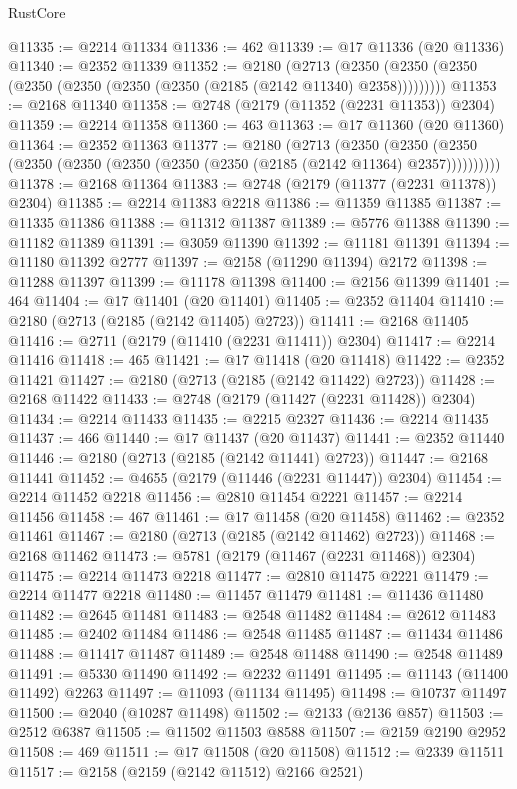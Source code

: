 \begin{lexlean}{RustCore}
\begin{coremodule}
@11335 := @2214 @11334
@11336 := 462
@11339 := @17 @11336 (@20 @11336)
@11340 := @2352 @11339
@11352 := @2180
    (@2713 (@2350 (@2350 (@2350 (@2350 (@2350 (@2350 (@2350 (@2185 (@2142 @11340) @2358)))))))))
@11353 := @2168 @11340
@11358 := @2748 (@2179 (@11352 (@2231 @11353)) @2304)
@11359 := @2214 @11358
@11360 := 463
@11363 := @17 @11360 (@20 @11360)
@11364 := @2352 @11363
@11377 := @2180
    (@2713
      (@2350 (@2350 (@2350 (@2350 (@2350 (@2350 (@2350 (@2350 (@2185 (@2142 @11364) @2357))))))))))
@11378 := @2168 @11364
@11383 := @2748 (@2179 (@11377 (@2231 @11378)) @2304)
@11385 := @2214 @11383 @2218
@11386 := @11359 @11385
@11387 := @11335 @11386
@11388 := @11312 @11387
@11389 := @5776 @11388
@11390 := @11182 @11389
@11391 := @3059 @11390
@11392 := @11181 @11391
@11394 := @11180 @11392 @2777
@11397 := @2158 (@11290 @11394) @2172
@11398 := @11288 @11397
@11399 := @11178 @11398
@11400 := @2156 @11399
@11401 := 464
@11404 := @17 @11401 (@20 @11401)
@11405 := @2352 @11404
@11410 := @2180 (@2713 (@2185 (@2142 @11405) @2723))
@11411 := @2168 @11405
@11416 := @2711 (@2179 (@11410 (@2231 @11411)) @2304)
@11417 := @2214 @11416
@11418 := 465
@11421 := @17 @11418 (@20 @11418)
@11422 := @2352 @11421
@11427 := @2180 (@2713 (@2185 (@2142 @11422) @2723))
@11428 := @2168 @11422
@11433 := @2748 (@2179 (@11427 (@2231 @11428)) @2304)
@11434 := @2214 @11433
@11435 := @2215 @2327
@11436 := @2214 @11435
@11437 := 466
@11440 := @17 @11437 (@20 @11437)
@11441 := @2352 @11440
@11446 := @2180 (@2713 (@2185 (@2142 @11441) @2723))
@11447 := @2168 @11441
@11452 := @4655 (@2179 (@11446 (@2231 @11447)) @2304)
@11454 := @2214 @11452 @2218
@11456 := @2810 @11454 @2221
@11457 := @2214 @11456
@11458 := 467
@11461 := @17 @11458 (@20 @11458)
@11462 := @2352 @11461
@11467 := @2180 (@2713 (@2185 (@2142 @11462) @2723))
@11468 := @2168 @11462
@11473 := @5781 (@2179 (@11467 (@2231 @11468)) @2304)
@11475 := @2214 @11473 @2218
@11477 := @2810 @11475 @2221
@11479 := @2214 @11477 @2218
@11480 := @11457 @11479
@11481 := @11436 @11480
@11482 := @2645 @11481
@11483 := @2548 @11482
@11484 := @2612 @11483
@11485 := @2402 @11484
@11486 := @2548 @11485
@11487 := @11434 @11486
@11488 := @11417 @11487
@11489 := @2548 @11488
@11490 := @2548 @11489
@11491 := @5330 @11490
@11492 := @2232 @11491
@11495 := @11143 (@11400 @11492) @2263
@11497 := @11093 (@11134 @11495)
@11498 := @10737 @11497
@11500 := @2040 (@10287 @11498)
@11502 := @2133 (@2136 @857)
@11503 := @2512 @6387
@11505 := @11502 @11503 @8588
@11507 := @2159 @2190 @2952
@11508 := 469
@11511 := @17 @11508 (@20 @11508)
@11512 := @2339 @11511
@11517 := @2158 (@2159 (@2142 @11512) @2166 @2521)

\end{coremodule}
\end{lexlean}
